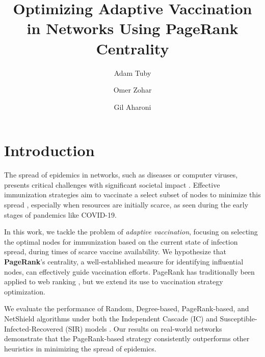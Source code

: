 \documentclass[9pt]{extarticle}
\title{
    Optimizing Adaptive Vaccination in Networks Using PageRank Centrality
}
\author{
    Adam Tuby
    \and
    Omer Zohar
    \and
    Gil Aharoni
}
\date{}
\begin{document}
\maketitle


\vspace{-0.8cm}
\section{Introduction}
\label{sec:introduction}
\vspace{-0.1cm}

The spread of epidemics in networks, such as diseases or computer viruses, presents critical challenges with significant societal impact \cite{newman2003structure,pastor2001epidemic}. Effective immunization strategies aim to vaccinate a select subset of nodes to minimize this spread \cite{pastor2002immunization,cohen2003efficient}, especially when resources are initially scarce, as seen during the early stages of pandemics like COVID-19.

In this work, we tackle the problem of \textit{adaptive vaccination}, focusing on selecting the optimal nodes for immunization based on the current state of infection spread, during times of scarce vaccine availability. We hypothesize that \textbf{PageRank}'s centrality, a well-established measure for identifying influential nodes, can effectively guide vaccination efforts. PageRank has traditionally been applied to web ranking \cite{page1999pagerank}, but we extend its use to vaccination strategy optimization.

We evaluate the performance of Random, Degree-based, PageRank-based, and NetShield algorithms \cite{tong2010vulnerability} under both the Independent Cascade (IC) and Susceptible-Infected-Recovered (SIR) models \cite{kempe2003maximizing,kermack1927contribution}. Our results on real-world networks demonstrate that the PageRank-based strategy consistently outperforms other heuristics in minimizing the spread of epidemics.
\end{document}
